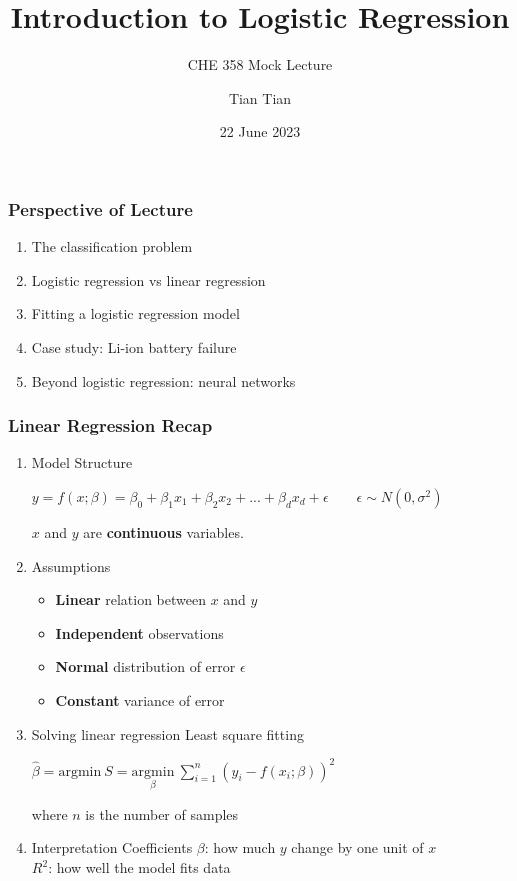 \documentclass[10pt,aspectratio=169]{beamer}
\title{\Large \bfseries Introduction to Logistic Regression}
\subtitle{\large CHE 358 Mock Lecture}
\author{\large Tian Tian}
\date{\large 22 June 2023}
\begin{document}
 {  \frame{\titlepage} }


\begin{frame}[c]
  \frametitle{Perspective of Lecture}
  \begin{enumerate}
    \vfill \item The classification problem %
    \vfill \item Logistic regression vs linear regression %
    \vfill \item Fitting a logistic regression model %
    \vfill \item Case study: Li-ion battery failure %
    \vfill \item Beyond logistic regression: neural networks %
  \end{enumerate}
\end{frame}


\begin{frame}
  \frametitle{Linear Regression Recap}
  \begin{enumerate}
  \item Model Structure

    \vfill
    $y = f(x; \beta) = β_{0} + β_{1} x_{1} + β_{2} x_{2} + ... + β_{d}
    x_{d} + \epsilon \quad\quad \epsilon \sim N(0, \sigma^{2})$

    $x$ and $y$ are \textbf{continuous} variables.
    
    \vfill \item Assumptions

    \vfill
    \begin{itemize}
    \item \textbf{Linear} relation between $x$ and $y$
    \item \textbf{Independent} observations
    \item \textbf{Normal} distribution of error $\epsilon$
    \item \textbf{Constant} variance of error
    \end{itemize}


 
    \vfill \item Solving linear regression \vfill Least square fitting
    
    ${\displaystyle \hat{\beta} = \mathrm{argmin}\ S =
      \underset{\beta}{\mathrm{argmin}}\ \sum_{i=1}^{n} (y_{i} -
      f(x_{i}; \beta))^{2}}$

    where $n$ is the number of samples
    
    \vfill \item Interpretation \vfill
    Coefficients $\beta$: how much $y$ change by one unit of $x$\\
    $R^{2}$: how well the model fits data
    
    
  \end{enumerate}

\end{frame}
\end{document}
